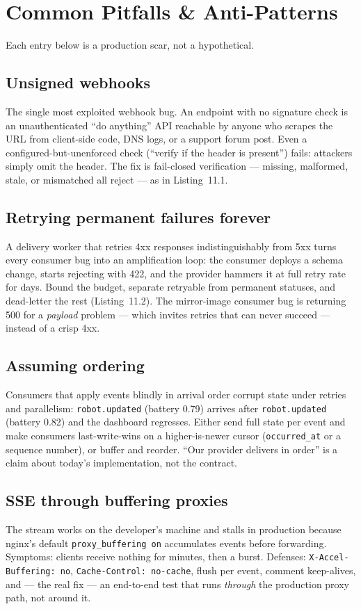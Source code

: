 \section{Common Pitfalls \& Anti-Patterns}
\label{sec:ch11-pitfalls}

Each entry below is a production scar, not a hypothetical.

\subsection{Unsigned webhooks}
The single most exploited webhook bug. An endpoint with no signature check is
an unauthenticated ``do anything'' API reachable by anyone who scrapes the
URL from client-side code, DNS logs, or a support forum post. Even a
configured-but-unenforced check (``verify if the header is present'') fails:
attackers simply omit the header. The fix is fail-closed verification ---
missing, malformed, stale, or mismatched all reject --- as in Listing~11.1.

\subsection{Retrying permanent failures forever}
A delivery worker that retries 4xx responses indistinguishably from 5xx turns
every consumer bug into an amplification loop: the consumer deploys a schema
change, starts rejecting with 422, and the provider hammers it at full retry
rate for days. Bound the budget, separate retryable from permanent statuses,
and dead-letter the rest (Listing~11.2). The mirror-image consumer bug is
returning 500 for a \emph{payload} problem --- which invites retries that can
never succeed --- instead of a crisp 4xx.

\subsection{Assuming ordering}
Consumers that apply events blindly in arrival order corrupt state under
retries and parallelism: \texttt{robot.updated} (battery 0.79) arrives after
\texttt{robot.updated} (battery 0.82) and the dashboard regresses. Either
send full state per event and make consumers last-write-wins on a
higher-is-newer cursor (\texttt{occurred\_at} or a sequence number), or
buffer and reorder. ``Our provider delivers in order'' is a claim about
today's implementation, not the contract.

\subsection{SSE through buffering proxies}
The stream works on the developer's machine and stalls in production because
nginx's default \texttt{proxy\_buffering on} accumulates events before
forwarding. Symptoms: clients receive nothing for minutes, then a burst.
Defenses: \texttt{X-Accel-Buffering: no}, \texttt{Cache-Control: no-cache},
flush per event, comment keep-alives, and --- the real fix --- an end-to-end
test that runs \emph{through} the production proxy path, not around it.

